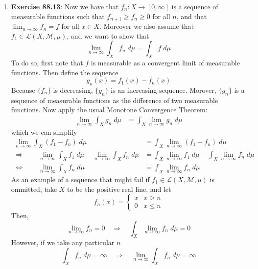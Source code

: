 \documentclass[12pt]{article}
\theoremstyle{plain}
\theoremstyle{definition}
\theoremstyle{remark}
\begin{document}
\begin{enumerate}
\newpage
\item \textbf{Exercise 88.13}: Now we have that $f_n:X\rightarrow[0,\infty]$ is a sequence of measurable functions such that $f_{n+1} \geq f_n \geq 0$ for all $n$, and that $\lim_{n\rightarrow\infty} f_n = f$ for all $x\in X$. Moreover we also assume that $f_1\in\mathscr{L}(X,\mathscr{M},\mu)$, and we want to show that
\begin{equation}
    \lim_{n\rightarrow\infty}\int_X f_n \; d\mu
    = \int_X f \; d\mu
\end{equation}
To do so, first note that $f$ is measurable as a convergent limit of measurable functions. Then define the sequence
\[
    g_n(x) = f_1(x) - f_n(x)
\]
Because $\{f_n\}$ is decreasing, $\{g_n\}$ is an increasing sequence. Morover, $\{g_n\}$ is a sequence of measurable functions as the difference of two measurable functions. Now apply the usual Monotone Convergence Theorem:
\begin{align*}
    \lim_{n\rightarrow\infty} \int_X g_n \; d\mu &= 
    \int_X \lim_{n\rightarrow\infty} g_n \; d\mu
\end{align*}
which we can simplify
\begin{align*}
    \lim_{n\rightarrow\infty} \int_X (f_1-f_n) \; d\mu &= 
    \int_X \lim_{n\rightarrow\infty} (f_1-f_n) \; d\mu \\
    \Rightarrow\qquad
    \lim_{n\rightarrow\infty} \int_X f_1 \; d\mu -
    \lim_{n\rightarrow\infty} \int_X f_n \; d\mu &= 
    \int_X \lim_{n\rightarrow\infty} f_1 \; d\mu 
    - \int_X \lim_{n\rightarrow\infty} f_n \; d\mu \\ 
    \Leftrightarrow\qquad
    \lim_{n\rightarrow\infty} \int_X f_n \; d\mu &= 
    \int_X \lim_{n\rightarrow\infty} f_n \; d\mu 
\end{align*}
As an example of a sequence that might fail if $f_1\in\mathscr{L}(X,\mathscr{M},\mu)$ is ommitted, take $X$ to be the positive real line, and let 
\[
    f_n(x) = \begin{cases} x & x> n \\ 0 & x \leq n
    \end{cases}
\] 
Then, 
\[
    \lim_{n\rightarrow\infty} f_n = 0 \quad 
    \Rightarrow\quad
    \int_X \lim_{n\rightarrow\infty} f_n \; d\mu = 0 
\]
However, if we take any particular $n$
\[
    \int_X f_n \; d\mu = \infty
    \quad \Rightarrow\quad
    \lim_{n\rightarrow\infty}\int_X f_n \; d\mu = \infty
\]




\end{enumerate}
\end{document}
